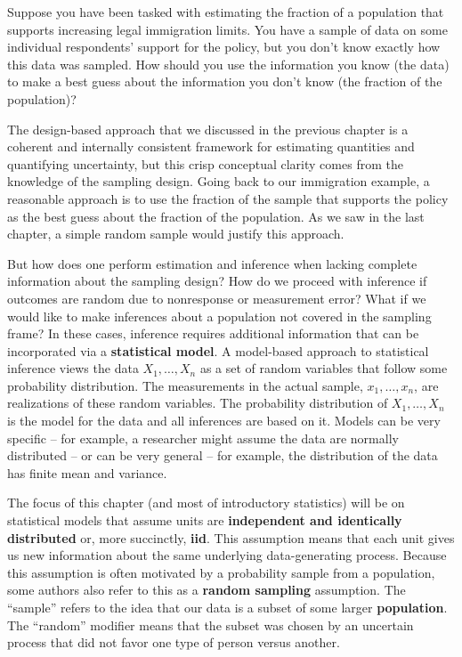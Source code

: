 \documentclass[
  letterpaper,
  DIV=11,
  numbers=noendperiod]{scrreprt}
\theoremstyle{plain}
\theoremstyle{definition}
\theoremstyle{definition}
\theoremstyle{remark}
\begin{document}
Suppose you have been tasked with estimating the fraction of a
population that supports increasing legal immigration limits. You have a
sample of data on some individual respondents' support for the policy,
but you don't know exactly how this data was sampled. How should you use
the information you know (the data) to make a best guess about the
information you don't know (the fraction of the population)?

The design-based approach that we discussed in the previous chapter is a
coherent and internally consistent framework for estimating quantities
and quantifying uncertainty, but this crisp conceptual clarity comes
from the knowledge of the sampling design. Going back to our immigration
example, a reasonable approach is to use the fraction of the sample that
supports the policy as the best guess about the fraction of the
population. As we saw in the last chapter, a simple random sample would
justify this approach.

But how does one perform estimation and inference when lacking complete
information about the sampling design? How do we proceed with inference
if outcomes are random due to nonresponse or measurement error? What if
we would like to make inferences about a population not covered in the
sampling frame? In these cases, inference requires additional
information that can be incorporated via a \textbf{statistical model}. A
model-based approach to statistical inference views the data
\(X_1,\ldots, X_n\) as a set of random variables that follow some
probability distribution. The measurements in the actual sample,
\(x_1, \ldots, x_n\), are realizations of these random variables. The
probability distribution of \(X_1,\ldots, X_n\) is the model for the
data and all inferences are based on it. Models can be very specific --
for example, a researcher might assume the data are normally distributed
-- or can be very general -- for example, the distribution of the data
has finite mean and variance.

The focus of this chapter (and most of introductory statistics) will be
on statistical models that assume units are \textbf{independent and
identically distributed} or, more succinctly, \textbf{iid}. This
assumption means that each unit gives us new information about the same
underlying data-generating process. Because this assumption is often
motivated by a probability sample from a population, some authors also
refer to this as a \textbf{random sampling} assumption. The ``sample''
refers to the idea that our data is a subset of some larger
\textbf{population}. The ``random'' modifier means that the subset was
chosen by an uncertain process that did not favor one type of person
versus another.
\end{document}
